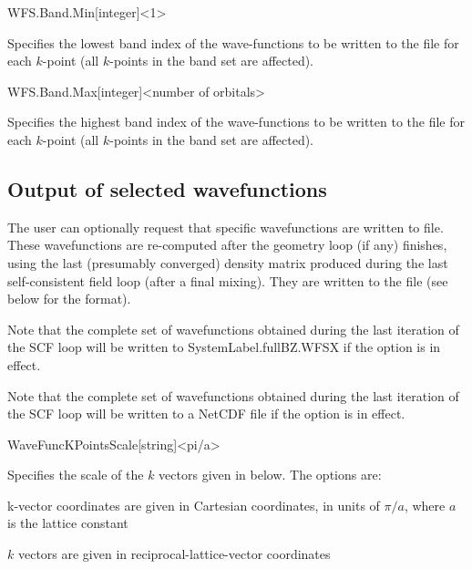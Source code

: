 \begin{fdfentry}{WFS.Band.Min}[integer]<1>
  
  Specifies the lowest band index of the wave-functions to be written
  to the file  for each $k$-point (all $k$-points in the
  band set are affected).

\end{fdfentry}

\begin{fdfentry}{WFS.Band.Max}[integer]<number of orbitals>
  
  Specifies the highest band index of the wave-functions to be written
  to the file  for each $k$-point (all $k$-points in the
  band set are affected).

\end{fdfentry}

\subsection{Output of selected wavefunctions}
\label{sec:wf-output-user}

The user can optionally request that specific wavefunctions are
written to file. These wavefunctions are re-computed after the
geometry loop (if any) finishes, using the last (presumably converged)
density matrix produced during the last self-consistent field loop
(after a final mixing). They are written to the
 file (see below for the format).

Note that the complete set of wavefunctions obtained during the last
iteration of the SCF loop will be written to SystemLabel.fullBZ.WFSX
if the  option is in effect.

Note that the complete set of wavefunctions obtained during the last
iteration of the SCF loop will be written to a NetCDF file
 if the  option is in effect.

\begin{fdfentry}{WaveFuncKPointsScale}[string]<pi/a>
  
  Specifies the scale of the $k$ vectors given in
   below.  The options are:
  \begin{fdfoptions}
    \option[pi/a]%
    k-vector coordinates are given in Cartesian coordinates, in units
    of $\pi/a$, where $a$ is the lattice constant

    \option[ReciprocalLatticeVectors]%
    $k$ vectors are given in reciprocal-lattice-vector coordinates

  \end{fdfoptions}

\end{fdfentry}

